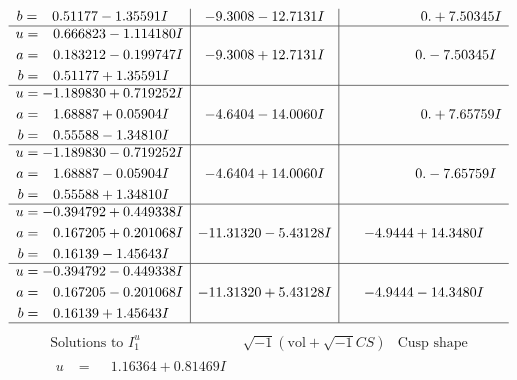 \documentclass[1p]{elsarticle_modified}
\theoremstyle{definition}
\newcommand{\I}{\sqrt{-1}}
\begin{document}
$$\begin{array}{c|c|c}
\begin{aligned}
b &= \phantom{-}0.51177 - 1.35591 I\end{aligned}
 & -9.3008 - 12.7131 I & \phantom{-0.000000 -}0. + 7.50345 I \\ \hline\begin{aligned}
u &= \phantom{-}0.666823 - 1.114180 I \\
a &= \phantom{-}0.183212 - 0.199747 I \\
b &= \phantom{-}0.51177 + 1.35591 I\end{aligned}
 & -9.3008 + 12.7131 I & \phantom{-0.000000 } 0. - 7.50345 I \\ \hline\begin{aligned}
u &= -1.189830 + 0.719252 I \\
a &= \phantom{-}1.68887 + 0.05904 I \\
b &= \phantom{-}0.55588 - 1.34810 I\end{aligned}
 & -4.6404 - 14.0060 I & \phantom{-0.000000 -}0. + 7.65759 I \\ \hline\begin{aligned}
u &= -1.189830 - 0.719252 I \\
a &= \phantom{-}1.68887 - 0.05904 I \\
b &= \phantom{-}0.55588 + 1.34810 I\end{aligned}
 & -4.6404 + 14.0060 I & \phantom{-0.000000 } 0. - 7.65759 I \\ \hline\begin{aligned}
u &= -0.394792 + 0.449338 I \\
a &= \phantom{-}0.167205 + 0.201068 I \\
b &= \phantom{-}0.16139 - 1.45643 I\end{aligned}
 & -11.31320 - 5.43128 I & -4.9444 + 14.3480 I \\ \hline\begin{aligned}
u &= -0.394792 - 0.449338 I \\
a &= \phantom{-}0.167205 - 0.201068 I \\
b &= \phantom{-}0.16139 + 1.45643 I\end{aligned}
 & -11.31320 + 5.43128 I & -4.9444 - 14.3480 I\\
 \hline 
 \end{array}$$\newpage$$\begin{array}{c|c|c}  
\text{Solutions to }I^u_{1}& \I (\text{vol} + \sqrt{-1}CS) & \text{Cusp shape}\\
 \hline 
\begin{aligned}
u &= \phantom{-}1.16364 + 0.81469 I \\

\end{aligned}
\end{array}$$
\end{document}
